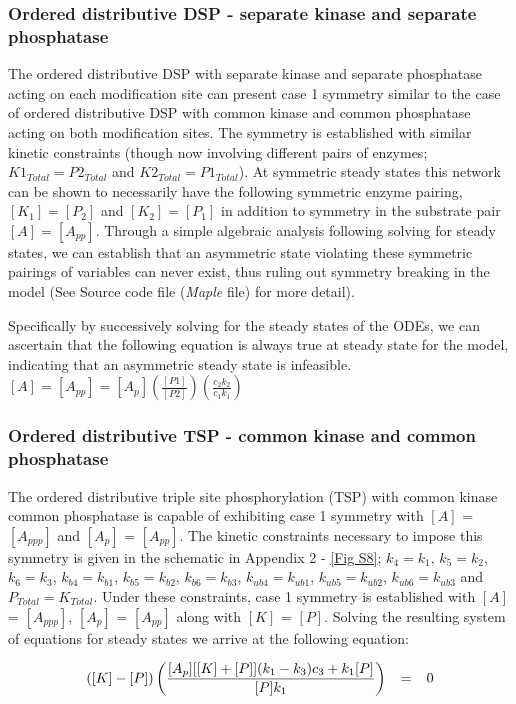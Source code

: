 \documentclass[9pt,lineno]{elife}
\begin{document}
\begin{appendixbox}
\subsubsection*{Ordered distributive DSP - separate kinase and separate phosphatase} 
The ordered distributive DSP with separate kinase and separate phosphatase acting on each modification site can present case 1 symmetry similar to the case of ordered distributive DSP with common kinase and common phosphatase acting on both modification sites. The symmetry is established with similar kinetic constraints (though now involving different pairs of enzymes; $K1_{Total} = P2_{Total}$ and $K2_{Total} = P1_{Total}$). At symmetric steady states this network can be shown to necessarily have the following symmetric enzyme pairing, $[K_1] = [P_2]$ and $[K_2] = [P_1]$ in addition to symmetry in the substrate pair $[A] = [A_{pp}]$. Through a simple algebraic analysis following solving for steady states, we can establish that an asymmetric state violating these symmetric pairings of variables can never exist, thus ruling out symmetry breaking in the model (See Source code file (\textit{Maple} file) for more detail). 

Specifically by successively solving for the  steady states of the ODEs, we can ascertain that the following equation is always true at steady state for the model, indicating that an asymmetric steady state is infeasible. 
$[A] = [A_{pp}] = [A_p]\left( \frac{[P1]}{[P2]}\right)\left(\frac{c_2k_2}{c_1k_1}\right) $

\subsubsection*{Ordered distributive TSP - common kinase and common phosphatase}
The ordered distributive  triple site phosphorylation (TSP)  with common kinase common phosphatase is capable of exhibiting case 1 symmetry with $[A]$ = $[A_{ppp}]$ and $[A_p]$ = $[A_{pp}]$. The kinetic constraints necessary to impose this symmetry is given in the schematic in Appendix 2 - \cref{Fig S8}; $k_4 = k_1$, $k_5 = k_2$, $k_6 = k_3$, $k_{b4} = k_{b1}$, $k_{b5} = k_{b2}$, $k_{b6} = k_{b3}$, $k_{ub4} = k_{ub1}$, $k_{ub5} = k_{ub2}$, $k_{ub6} = k_{ub3}$ and $P_{Total} = K_{Total}$. Under these constraints, case 1 symmetry is established with $[A]$ = $[A_{ppp}]$, $[A_p]$ = $[A_{pp}]$ along with  $[K]$ = $[P]$. Solving the resulting system of equations for steady states we arrive at the following equation:

\begin{equation}
\scriptsize{    ([K]-[P])\left(\frac{[A_p][[K]+[P]](k_1-k_3)c_3+k_1[P]}{[P]k_1} \right) \quad = \quad 0}
\end{equation}


\end{appendixbox}
\end{document}
